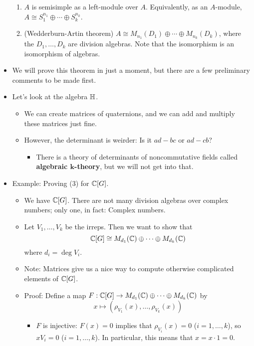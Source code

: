 \documentclass[../notes.tex]{subfiles}
\begin{document}
\begin{itemize}
\begin{enumerate}
        \item $A$ is semisimple as a left-module over $A$. Equivalently, as an $A$-module, $A\cong S_1^{n_1}\oplus\cdots\oplus S_k^{n_k}$.
        \item (Wedderburn-Artin theorem) $A\cong M_{n_1}(D_1)\oplus\cdots\oplus M_{n_k}(D_k)$, where the $D_1,\dots,D_k$ are division algebras. Note that the isomorphism is an isomorphism of algebras.
    \end{enumerate}
    \item We will prove this theorem in just a moment, but there are a few preliminary comments to be made first.
    \item Let's look at the algebra $\mathbb{H}$.
    \begin{itemize}
        \item We can create matrices of quaternions, and we can add and multiply these matrices just fine.
        \item However, the determinant is weirder: Is it $ad-bc$ or $ad-cb$?
        \begin{itemize}
            \item There is a theory of determinants of noncommutative fields called \textbf{algebraic $\bm{k}$-theory}, but we will not get into that.
        \end{itemize}
    \end{itemize}
    \item Example: Proving (3) for $\mathbb{C}[G]$.
    \begin{itemize}
        \item We have $\mathbb{C}[G]$. There are not many division algebras over complex numbers; only one, in fact: Complex numbers.
        \item Let $V_1,\dots,V_k$ be the irreps. Then we want to show that
        \begin{equation*}
            \mathbb{C}[G] \cong M_{d_1}(\mathbb{C})\oplus\cdots\oplus M_{d_k}(\mathbb{C})
        \end{equation*}
        where $d_i=\deg V_i$.
        \item Note: Matrices give us a nice way to compute otherwise complicated elements of $\mathbb{C}[G]$.
        \item Proof: Define a map $F:\mathbb{C}[G]\to M_{d_1}(\mathbb{C})\oplus\cdots\oplus M_{d_k}(\mathbb{C})$ by
        \begin{equation*}
            x \mapsto (\rho_{V_1}(x),\dots,\rho_{V_k}(x))
        \end{equation*}
        \begin{itemize}
            \item $F$ is injective: $F(x)=0$ implies that $\rho_{V_i}(x)=0$ ($i=1,\dots,k$), so $xV_i=0$ ($i=1,\dots,k$). In particular, this means that $x=x\cdot 1=0$.

\end{itemize}
\end{itemize}
\end{itemize}
\end{document}
